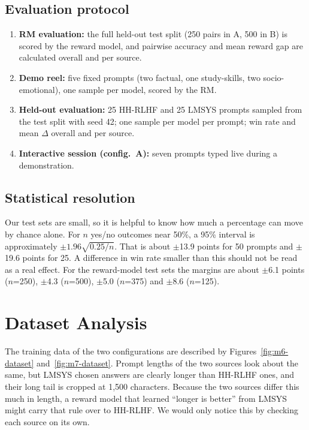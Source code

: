 \subsection{Evaluation protocol}
\begin{enumerate}
  \item \textbf{RM evaluation:} the full held-out test split (250 pairs in A, 500 in B) is scored by the reward model, and pairwise accuracy and mean reward gap are calculated overall and per source.
  \item \textbf{Demo reel:} five fixed prompts (two factual, one study-skills, two socio-emotional), one sample per model, scored by the RM.
  \item \textbf{Held-out evaluation:} 25 HH-RLHF and 25 LMSYS prompts sampled from the test split with seed 42; one sample per model per prompt; win rate and mean $\Delta$ overall and per source.
  \item \textbf{Interactive session (config.\ A):} seven prompts typed live during a demonstration.
\end{enumerate}

\subsection{Statistical resolution}
Our test sets are small, so it is helpful to know how much a percentage can move by chance alone. For $n$ yes/no outcomes near 50\%, a 95\% interval is approximately $\pm1.96\sqrt{0.25/n}$. That is about $\pm$13.9 points for 50 prompts and $\pm$19.6 points for 25. A difference in win rate smaller than this should not be read as a real effect. For the reward-model test sets the margins are about $\pm$6.1 points ($n$=250), $\pm$4.3 ($n$=500), $\pm$5.0 ($n$=375) and $\pm$8.6 ($n$=125).

\section{Dataset Analysis}
\label{sec:res-data}

The training data of the two configurations are described by Figures~\ref{fig:m6-dataset} and~\ref{fig:m7-dataset}. Prompt lengths of the two sources look about the same, but LMSYS chosen answers are clearly longer than HH-RLHF ones, and their long tail is cropped at 1,500 characters. Because the two sources differ this much in length, a reward model that learned ``longer is better'' from LMSYS might carry that rule over to HH-RLHF. We would only notice this by checking each source on its own.


